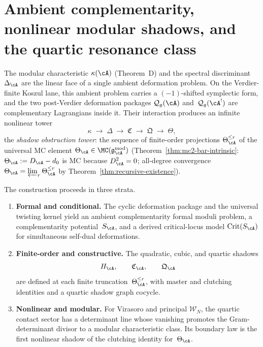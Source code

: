 \chapter[Ambient complementarity and nonlinear modular shadows]{Ambient complementarity, nonlinear modular shadows, and the quartic resonance class}
\label{app:nonlinear-modular-shadows}

The modular characteristic $\kappa(\cA)$ (Theorem~D) and the spectral
discriminant~$\Delta_{\cA}$ are the linear face of a single ambient
deformation problem. On the Verdier-finite Koszul lane, this ambient
problem carries a $(-1)$-shifted symplectic form, and the two
post-Verdier deformation packages $\mathcal{Q}_g(\cA)$
and~$\mathcal{Q}_g(\cA^{!})$ are complementary Lagrangians inside it.
Their interaction produces an infinite nonlinear tower
\[
\kappa \;\longrightarrow\; \Delta \;\longrightarrow\;
\mathfrak{C} \;\longrightarrow\; \mathfrak{Q}
\;\longrightarrow\; \Theta,
\]
the \emph{shadow obstruction tower}: the sequence of finite-order
projections $\Theta_\cA^{\leq r}$ of the universal MC element
$\Theta_\cA \in \MC(\gAmod)$
(Theorem~\ref{thm:mc2-bar-intrinsic}: $\Theta_\cA := D_\cA - d_0$
is MC because $D_\cA^2 = 0$; all-degree convergence
$\Theta_\cA = \varprojlim_r \Theta_\cA^{\leq r}$ by
Theorem~\ref{thm:recursive-existence}).

The construction proceeds in three strata.
\begin{enumerate}[label=\textup{(\roman*)}]
\item \textbf{Formal and conditional.} The cyclic deformation package and the universal twisting kernel yield an ambient complementarity formal moduli problem, a complementarity potential~$S_\cA$, and a derived critical-locus model $\mathrm{Crit}(S_\cA)$ for simultaneous self-dual deformations.
\item \textbf{Finite-order and constructive.} The quadratic, cubic, and quartic shadows
\[
H_{\cA},\qquad \mathfrak C_{\cA},\qquad \mathfrak Q_{\cA}
\]
are defined at each finite truncation~$\Theta_\cA^{\leq r}$, with master and clutching identities and a quartic shadow graph cocycle.
\item \textbf{Nonlinear and modular.} For Virasoro and principal $\mathcal W_N$, the quartic contact sector has a determinant line whose vanishing promotes the Gram-determinant divisor to a modular characteristic class. Its boundary law is the first nonlinear shadow of the clutching identity for~$\Theta_{\cA}$.
\end{enumerate}

